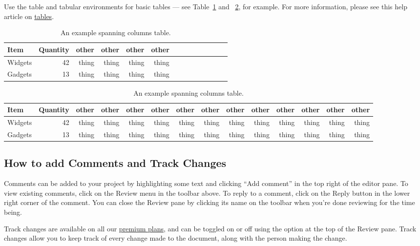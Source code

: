 \documentclass[twocolumn, 9pt]{extarticle}
\begin{document}
Use the table and tabular environments for basic tables --- see Table~\ref{tab:widgets} and ~\ref{tab:widgets_wide}, for example. For more information, please see this help article on \href{https://www.overleaf.com/learn/latex/tables}{tables}. 

\begin{table}[ht]
\centering
\begin{tabular}{l|r|r|r|r|r|r|r|r|r|r|r|r|r}
Item & Quantity & other & other & other & other  \\\hline
Widgets & 42 & thing & thing & thing & thing  \\
Gadgets & 13 & thing & thing & thing & thing 
\end{tabular}
\caption{\label{tab:widgets}An example spanning columns table.}
\end{table}



\begin{table}[ht]
\centering
\begin{tabular}{l|r|r|r|r|r|r|r|r|r|r|r|r|r}
Item & Quantity & other & other & other & other & other & other & other & other  & other & other & other & other  \\\hline
Widgets & 42 & thing & thing & thing & thing & thing & thing & thing & thing & thing & thing & thing & thing \\
Gadgets & 13 & thing & thing & thing & thing & thing & thing & thing & thing & thing & thing & thing & thing
\end{tabular}
\caption{\label{tab:widgets_wide}An example spanning columns table.}
\end{table}

\subsection{How to add Comments and Track Changes}

Comments can be added to your project by highlighting some text and clicking ``Add comment'' in the top right of the editor pane. To view existing comments, click on the Review menu in the toolbar above. To reply to a comment, click on the Reply button in the lower right corner of the comment. You can close the Review pane by clicking its name on the toolbar when you're done reviewing for the time being.

Track changes are available on all our \href{https://www.overleaf.com/user/subscription/plans}{premium plans}, and can be toggled on or off using the option at the top of the Review pane. Track changes allow you to keep track of every change made to the document, along with the person making the change. 
\end{document}
